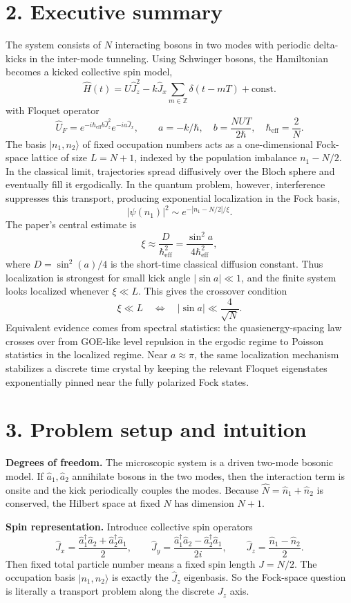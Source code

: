 \documentclass[11pt]{article}
\begin{document}
\section*{2. Executive summary}
The system consists of $N$ interacting bosons in two modes with periodic delta-kicks in the inter-mode tunneling. Using Schwinger bosons, the Hamiltonian becomes a kicked collective spin model,
\[
\hat H(t)=U\hat J_z^2-k\hat J_x\sum_{m\in\mathbb Z}\delta(t-mT)+\text{const.}
\]
with Floquet operator
\[
\hat U_F=e^{-i\hbar_\mathrm{eff} b \hat J_z^2}e^{-ia\hat J_x},\qquad a=-k/\hbar,\quad b=\frac{NUT}{2\hbar},\quad \hbar_\mathrm{eff}=\frac{2}{N}.
\]
The basis $|n_1,n_2\rangle$ of fixed occupation numbers acts as a one-dimensional Fock-space lattice of size $L=N+1$, indexed by the population imbalance $n_1-N/2$. In the classical limit, trajectories spread diffusively over the Bloch sphere and eventually fill it ergodically. In the quantum problem, however, interference suppresses this transport, producing exponential localization in the Fock basis,
\[
|\psi(n_1)|^2\sim e^{-|n_1-N/2|/\xi}.
\]
The paper's central estimate is
\[
\xi \approx \frac{D}{\hbar_\mathrm{eff}^2} = \frac{\sin^2 a}{4\hbar_\mathrm{eff}^2},
\]
where $D=\sin^2(a)/4$ is the short-time classical diffusion constant. Thus localization is strongest for small kick angle $|\sin a|\ll 1$, and the finite system looks localized whenever $\xi\ll L$. This gives the crossover condition
\[
\xi\ll L \quad \Longleftrightarrow \quad |\sin a|\ll \frac{4}{\sqrt{N}}.
\]
Equivalent evidence comes from spectral statistics: the quasienergy-spacing law crosses over from GOE-like level repulsion in the ergodic regime to Poisson statistics in the localized regime. Near $a\approx\pi$, the same localization mechanism stabilizes a discrete time crystal by keeping the relevant Floquet eigenstates exponentially pinned near the fully polarized Fock states.

\section*{3. Problem setup and intuition}
\textbf{Degrees of freedom.} The microscopic system is a driven two-mode bosonic model. If $\hat a_1,\hat a_2$ annihilate bosons in the two modes, then the interaction term is onsite and the kick periodically couples the modes. Because $\hat N=\hat n_1+\hat n_2$ is conserved, the Hilbert space at fixed $N$ has dimension $N+1$.

\textbf{Spin representation.} Introduce collective spin operators
\[
\hat J_x=\frac{\hat a_1^\dagger\hat a_2+\hat a_2^\dagger\hat a_1}{2},\qquad
\hat J_y=\frac{\hat a_1^\dagger\hat a_2-\hat a_2^\dagger\hat a_1}{2i},\qquad
\hat J_z=\frac{\hat n_1-\hat n_2}{2}.
\]
Then fixed total particle number means a fixed spin length $J=N/2$. The occupation basis $|n_1,n_2\rangle$ is exactly the $\hat J_z$ eigenbasis. So the Fock-space question is literally a transport problem along the discrete $J_z$ axis.
\end{document}
